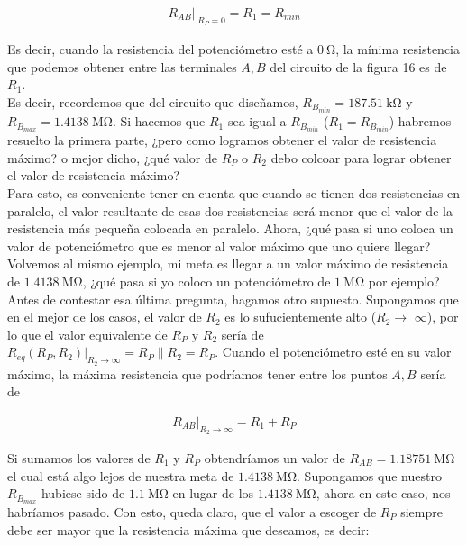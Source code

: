 \documentclass{article}
\begin{document}
\begin{align}
	R_{AB} |_{\;R_P=0} = R_1 = R_{min}
\end{align}


Es decir, cuando la resistencia del potenciómetro esté a $\qty{0}{\ohm}$, la mínima resistencia que podemos obtener entre las terminales $A,B$ del circuito de la figura 16 es de $R_1$. \\

Es decir, recordemos que del circuito que diseñamos, $R_{B_{min}} = \qty{187.51}{\kilo \ohm}$ y $R_{B_{max}} = \qty{1.4138}{\mega \ohm}$. Si hacemos que $R_1$ sea igual a $R_{B_{min}}$ ($R_1 = R_{B_{min}}$) habremos resuelto la primera parte, ¿pero como logramos obtener el valor de resistencia máximo? o mejor dicho, ¿qué valor de $R_P$ o $R_2$ debo colcoar para lograr obtener el valor de resistencia máximo? \\

Para esto, es conveniente tener en cuenta que cuando se tienen dos resistencias en paralelo, el valor resultante de esas dos resistencias será menor que el valor de la resistencia más pequeña colocada en paralelo. Ahora, ¿qué pasa si uno coloca un valor de potenciómetro que es menor al valor máximo que uno quiere llegar? Volvemos al mismo ejemplo, mi meta es llegar a un valor máximo de resistencia de $\qty{1.4138}{\mega \ohm}$, ¿qué pasa si yo coloco un potenciómetro de $\qty{1}{\mega \ohm}$ por ejemplo? Antes de contestar esa última pregunta, hagamos otro supuesto. Supongamos que en el mejor de los casos, el valor de $R_2$ es lo sufucientemente alto ($R_2 \rightarrow$ $\infty$), por lo que el valor equivalente de $R_P$ y $R_2$ sería de $R_{eq}(R_P, R_2)|_{R_2 \rightarrow \infty} = R_P \parallel R_2 = R_P$. Cuando el potenciómetro esté en su valor máximo, la máxima resistencia que podríamos tener entre los puntos $A,B$ sería de

\begin{align}
	R_{AB}|_{R_2 \rightarrow \infty} = R_1 + R_P
\end{align}

Si sumamos los valores de $R_1$ y $R_P$ obtendríamos un valor de $R_{AB} = \qty{1.18751}{\mega \ohm}$ el cual está algo lejos de nuestra meta de $\qty{1.4138}{\mega \ohm}$. Supongamos que nuestro $R_{B_{max}}$ hubiese sido de $\qty{1.1}{\mega \ohm}$ en lugar de los $\qty{1.4138}{\mega \ohm}$, ahora en este caso, nos habríamos pasado. Con esto, queda claro, que el valor a escoger de $R_P$ siempre debe ser mayor que la resistencia máxima que deseamos, es decir:
\end{document}
